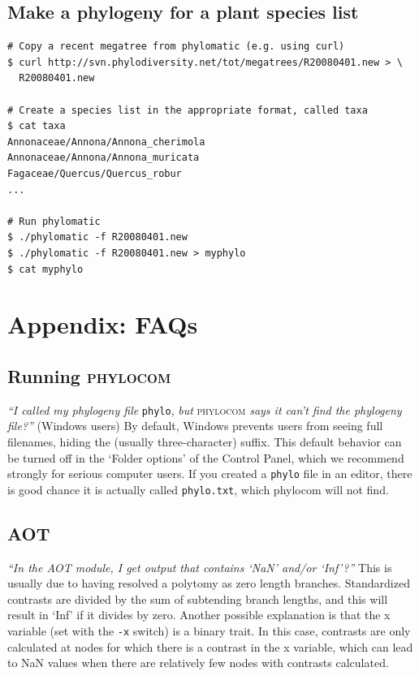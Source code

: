 \documentclass[12pt,letterpaper]{article}
\begin{document}
\subsection{Make a phylogeny for a plant species list}

\begin{verbatim}
# Copy a recent megatree from phylomatic (e.g. using curl)
$ curl http://svn.phylodiversity.net/tot/megatrees/R20080401.new > \
  R20080401.new

# Create a species list in the appropriate format, called taxa
$ cat taxa
Annonaceae/Annona/Annona_cherimola
Annonaceae/Annona/Annona_muricata
Fagaceae/Quercus/Quercus_robur
...

# Run phylomatic
$ ./phylomatic -f R20080401.new
$ ./phylomatic -f R20080401.new > myphylo
$ cat myphylo

\end{verbatim}

\section{Appendix: FAQs}

\setlength{\parindent}{0in}
\setlength{\parskip}{8pt}

\subsection{Running {\scshape phylocom}}

\textit{``I called my phylogeny file} \verb|phylo|, \textit{but}
       {\scshape phylocom} \textit{says it can't find the phylogeny
         file?''}  (Windows users) By default, Windows prevents users
       from seeing full filenames, hiding the (usually
       three-character) suffix.  This default behavior can be turned
       off in the `Folder options' of the Control Panel, which we
       recommend strongly for serious computer users.  If you created
       a \verb|phylo| file in an editor, there is good chance it is
       actually called \verb|phylo.txt|, which phylocom will not find.

\subsection{AOT}

\textit{``In the AOT module, I get output that contains `NaN' and/or
  `Inf'?''}  This is usually due to having resolved a polytomy as zero
length branches. Standardized contrasts are divided by the sum of
subtending branch lengths, and this will result in `Inf' if it divides
by zero. Another possible explanation is that the x variable (set with
the \texttt{-x} switch) is a binary trait. In this case, contrasts are only
calculated at nodes for which there is a contrast in the x variable,
which can lead to NaN values when there
are relatively few nodes with contrasts calculated.
\end{document}
